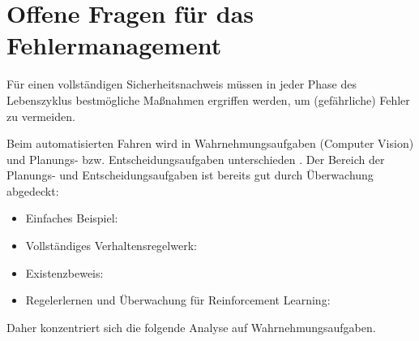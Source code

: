 \section[Offene Fragen]{Offene Fragen für das Fehlermanagement}
Für einen vollständigen Sicherheitsnachweis müssen in jeder Phase des
Lebenszyklus bestmögliche Maßnahmen ergriffen werden, um (gefährliche)
Fehler zu vermeiden.

Beim automatisierten Fahren wird in
Wahrnehmungsaufgaben (Computer Vision) und Planungs-
bzw. Entscheidungsaufgaben unterschieden
\cite{fernandes_rational_2017}.
Der Bereich der Planungs- und Entscheidungsaufgaben
ist bereits gut durch Überwachung abgedeckt:
\begin{itemize}
\item Einfaches Beispiel: \cite{fernandes_rational_2017}
\item Vollständiges Verhaltensregelwerk:
  \cite{shalev-shwartz_formal_2017}
\item Existenzbeweis: \cite{lygeros_controllers_1999}
\item Regelerlernen und Überwachung für Reinforcement Learning:
  \cite{ghosh_trusted_2016,akametalu_reachability-based_2014,fridovich-keil_planning_2017}
\end{itemize}
Daher konzentriert sich die folgende Analyse auf Wahrnehmungsaufgaben.

